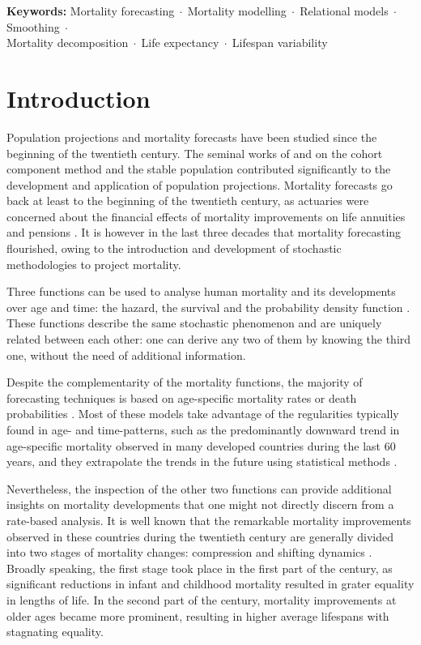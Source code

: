 \documentclass[11pt, a4paper]{article}
\begin{document}
\bigskip

\noindent \textbf{Keywords:} Mortality forecasting$\;\cdot\;$Mortality modelling$\;\cdot\;$Relational models$\;\cdot\;$Smoothing$\;\cdot\;$\\Mortality decomposition$\;\cdot\;$Life expectancy$\;\cdot\;$Lifespan variability

\section{Introduction}\label{Sec:Intro}

Population projections and mortality forecasts have been studied since the beginning of the twentieth century. The seminal works of \cite{whelpton1928population,whelpton1936empirical} and \cite{lotka1939theorie} on the cohort component method and the stable population contributed significantly to the development and application of population projections. Mortality forecasts go back at least to the beginning of the twentieth century, as actuaries were concerned about the financial effects of mortality improvements on life annuities and pensions \citep{pollard1987projection}. It is however in the last three decades that mortality forecasting flourished, owing to the introduction and development of stochastic methodologies to project mortality. 

Three functions can be used to analyse human mortality and its developments over age and time: the hazard, the survival and the probability density function \citep{klein2005survival}. These functions describe the same stochastic phenomenon and are uniquely related between each other: one can derive any two of them by knowing the third one, without the need of additional information. 

Despite the complementarity of the mortality functions, the majority of forecasting techniques is based on age-specific mortality rates or death probabilities \citep[for comprehensive reviews, see][]{booth2008mortality,cairns2009quantitative,shang2011point,stoeldraijer2013impact}. Most of these models take advantage of the regularities typically found in age- and time-patterns, such as the predominantly downward trend in age-specific mortality observed in many developed countries during the last 60 years, and they extrapolate the trends in the future using statistical methods \citep{haberman2011comparative}. 

Nevertheless, the inspection of the other two functions can provide additional insights on mortality developments that one might not directly discern from a rate-based analysis. It is well known that the remarkable mortality improvements observed in these countries during the twentieth century are generally divided into two stages of mortality changes: compression and shifting dynamics \cite[see, for example,][]{fries1980aging,wilmoth1999rectangularization,kannisto2000measuring,bongaarts2005long,canudas2008modal}. Broadly speaking, the first stage took place in the first part of the century, as significant reductions in infant and childhood mortality resulted in grater equality in lengths of life. In the second part of the century, mortality improvements at older ages became more prominent, resulting in higher average lifespans with stagnating equality. 
\end{document}
